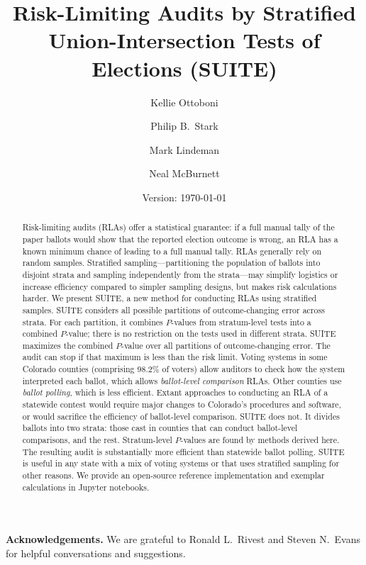 \documentclass[runningheads]{llncs}
\title{Risk-Limiting Audits by Stratified Union-Intersection Tests of Elections (SUITE)}
\author{
   Kellie Ottoboni\inst{1}\orcidID{0000-0002-9107-3402} \and
   Philip B.~Stark\inst{1}\orcidID{0000-0002-3771-9604} \and
   Mark Lindeman\inst{2}\orcidID{0000-0001-8815-815X} \and
   Neal McBurnett\orcidID{0000-0001-8667-1830} 
}
\institute{
Department of Statistics, University of California, Berkeley, CA, USA \and
Verified Voting Foundation}
\date{Version: \today}
\begin{document}
\maketitle


\begin{abstract}
Risk-limiting audits (RLAs) offer a statistical guarantee: if a full manual tally of the paper ballots would show that the reported election outcome is wrong, an RLA has a known minimum chance of leading to a full manual tally.
RLAs generally rely on random samples.
Stratified sampling---partitioning the population of ballots into disjoint
strata and sampling independently from the strata---may simplify logistics or increase efficiency compared
to simpler sampling designs, but makes risk calculations harder.
We present SUITE, a new method for conducting RLAs using stratified samples.
SUITE considers all possible partitions of outcome-changing error across strata.
For each partition, it combines $P$-values from stratum-level tests into a combined
$P$-value; there is no restriction on the tests used in different strata.
SUITE maximizes the combined $P$-value over all partitions of outcome-changing error. 
The audit can stop if that maximum is less than the risk limit.
Voting systems in some Colorado counties (comprising 98.2\% of voters)
allow auditors to check how the system interpreted each ballot, 
which allows \emph{ballot-level comparison} RLAs.
Other counties use \emph{ballot polling}, which is less efficient.
Extant approaches to conducting an RLA of a statewide contest would require major changes to 
Colorado's procedures and software, or would sacrifice the efficiency of ballot-level comparison.
SUITE does not. 
It divides ballots into two strata: those cast in counties that can conduct ballot-level comparisons, and the rest.
Stratum-level $P$-values are found by methods derived here.
The resulting audit is substantially more efficient than statewide ballot polling.
SUITE is useful in any state with a mix of voting systems or that uses stratified sampling
for other reasons.
We provide an open-source reference implementation and exemplar calculations in Jupyter notebooks.

\end{abstract}

\noindent
\textbf{Acknowledgements.}
We are grateful to Ronald L.~Rivest and Steven N.~Evans for helpful conversations and suggestions.
\end{document}
